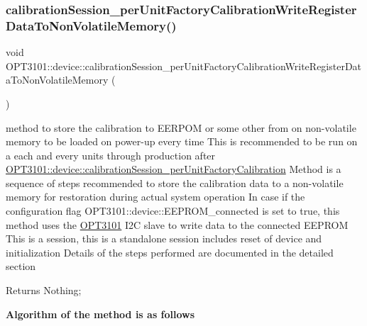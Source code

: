 \subsubsection{\texorpdfstring{calibration\+Session\+\_\+per\+Unit\+Factory\+Calibration\+Write\+Register\+Data\+To\+Non\+Volatile\+Memory()}{calibrationSession\_perUnitFactoryCalibrationWriteRegisterDataToNonVolatileMemory()}}
{\footnotesize\ttfamily void O\+P\+T3101\+::device\+::calibration\+Session\+\_\+per\+Unit\+Factory\+Calibration\+Write\+Register\+Data\+To\+Non\+Volatile\+Memory (\begin{DoxyParamCaption}{ }\end{DoxyParamCaption})}



method to store the calibration to E\+E\+R\+P\+OM or some other from on non-\/volatile memory to be loaded on power-\/up every time This is recommended to be run on a each and every units through production after \mbox{\hyperlink{class_o_p_t3101_1_1device_abad5b2d7405e735fa80041dbbf47502c}{O\+P\+T3101\+::device\+::calibration\+Session\+\_\+per\+Unit\+Factory\+Calibration}} Method is a sequence of steps recommended to store the calibration data to a non-\/volatile memory for restoration during actual system operation In case if the configuration flag O\+P\+T3101\+::device\+::\+E\+E\+P\+R\+O\+M\+\_\+connected is set to true, this method uses the \mbox{\hyperlink{namespace_o_p_t3101}{O\+P\+T3101}} I2C slave to write data to the connected E\+E\+P\+R\+OM This is a session, this is a standalone session includes reset of device and initialization Details of the steps performed are documented in the detailed section 

\begin{DoxyReturn}{Returns}
Nothing; 
\end{DoxyReturn}
{\bfseries Algorithm of the method is as follows}


